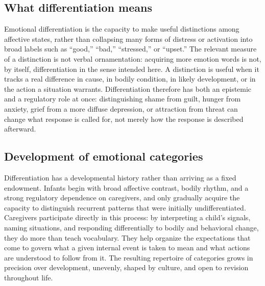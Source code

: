 \documentclass[11pt]{article}
\begin{document}
\subsection{What differentiation means}\label{sub:means}

Emotional differentiation is the capacity to make useful distinctions among affective states, rather than collapsing many forms of distress or activation into broad labels such as ``good,'' ``bad,'' ``stressed,'' or ``upset.'' The relevant measure of a distinction is not verbal ornamentation: acquiring more emotion words is not, by itself, differentiation in the sense intended here. A distinction is useful when it tracks a real difference in cause, in bodily condition, in likely development, or in the action a situation warrants. Differentiation therefore has both an epistemic and a regulatory role at once: distinguishing shame from guilt, hunger from anxiety, grief from a more diffuse depression, or attraction from threat can change what response is called for, not merely how the response is described afterward.

\subsection{Development of emotional categories}

Differentiation has a developmental history rather than arriving as a fixed endowment. Infants begin with broad affective contrast, bodily rhythm, and a strong regulatory dependence on caregivers, and only gradually acquire the capacity to distinguish recurrent patterns that were initially undifferentiated. Caregivers participate directly in this process: by interpreting a child's signals, naming situations, and responding differentially to bodily and behavioral change, they do more than teach vocabulary. They help organize the expectations that come to govern what a given internal event is taken to mean and what actions are understood to follow from it. The resulting repertoire of categories grows in precision over development, unevenly, shaped by culture, and open to revision throughout life.
\end{document}
